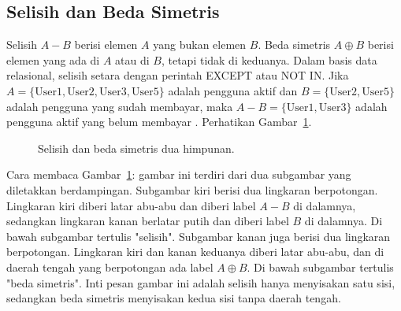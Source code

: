 \documentclass[11pt,a4paper]{article}
\begin{document}
\subsection{Selisih dan Beda Simetris}

Selisih $A-B$ berisi elemen $A$ yang bukan elemen $B$. Beda simetris $A \oplus B$ berisi elemen yang ada di $A$ atau di $B$, tetapi tidak di keduanya. Dalam basis data relasional, selisih setara dengan perintah EXCEPT atau NOT IN. Jika $A=\{\text{User1},\text{User2},\text{User3},\text{User5}\}$ adalah pengguna aktif dan $B=\{\text{User2},\text{User5}\}$ adalah pengguna yang sudah membayar, maka $A-B=\{\text{User1},\text{User3}\}$ adalah pengguna aktif yang belum membayar \cite{silberschatz}. Perhatikan Gambar~\ref{fig:selisih-simetris}.

\begin{figure}[H]
	\centering
	\caption{Selisih dan beda simetris dua himpunan.}
	\label{fig:selisih-simetris}
\end{figure}

Cara membaca Gambar~\ref{fig:selisih-simetris}: gambar ini terdiri dari dua subgambar yang diletakkan berdampingan. Subgambar kiri berisi dua lingkaran berpotongan. Lingkaran kiri diberi latar abu-abu dan diberi label $A-B$ di dalamnya, sedangkan lingkaran kanan berlatar putih dan diberi label $B$ di dalamnya. Di bawah subgambar tertulis "selisih". Subgambar kanan juga berisi dua lingkaran berpotongan. Lingkaran kiri dan kanan keduanya diberi latar abu-abu, dan di daerah tengah yang berpotongan ada label $A \oplus B$. Di bawah subgambar tertulis "beda simetris". Inti pesan gambar ini adalah selisih hanya menyisakan satu sisi, sedangkan beda simetris menyisakan kedua sisi tanpa daerah tengah.
\end{document}
